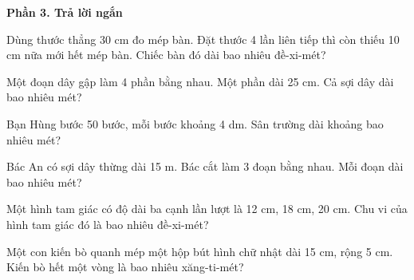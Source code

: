 \textbf{Phần 3. Trả lời ngắn}

\begin{ex} %
Dùng thước thẳng 30 cm đo mép bàn. Đặt thước 4 lần liên tiếp thì còn thiếu 10 cm nữa mới hết mép bàn. Chiếc bàn đó dài bao nhiêu đề-xi-mét?
\end{ex}

\begin{ex} %
Một đoạn dây gập làm 4 phần bằng nhau. Một phần dài 25 cm. Cả sợi dây dài bao nhiêu mét?
\end{ex}

\begin{ex} %
Bạn Hùng bước 50 bước, mỗi bước khoảng 4 dm. Sân trường dài khoảng bao nhiêu mét?
\end{ex}

\begin{ex} %
Bác An có sợi dây thừng dài 15 m. Bác cắt làm 3 đoạn bằng nhau. Mỗi đoạn dài bao nhiêu mét?
\end{ex}

\begin{ex} %
Một hình tam giác có độ dài ba cạnh lần lượt là 12 cm, 18 cm, 20 cm. Chu vi của hình tam giác đó là bao nhiêu đề-xi-mét?
\end{ex}

\begin{ex} %
Một con kiến bò quanh mép một hộp bút hình chữ nhật dài 15 cm, rộng 5 cm. Kiến bò hết một vòng là bao nhiêu xăng-ti-mét?
\end{ex}

